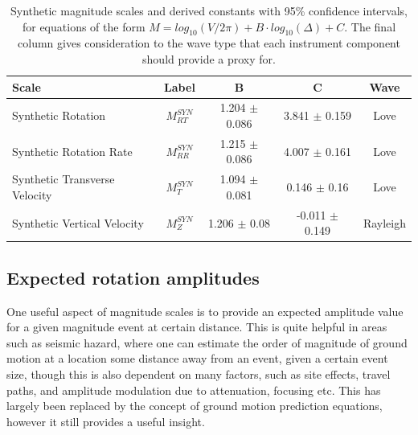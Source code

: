 \documentclass{gji}
\begin{document}
\begin{table}
\begin{minipage}{115mm}
	\begin{center}
		\begin{tabular}{ |l|c|c|c|c| } 
		        \bf{Scale} & \bf{Label} & \bf{B} & \bf{C}  & \bf{Wave}\\ \hline
        Synthetic Rotation  & $M^{SYN}_{RT}$ & 1.204 $\pm$ 0.086 & 3.841 $\pm$ 0.159  & Love \\ \hline
	Synthetic Rotation Rate & $M^{SYN}_{RR}$ & 1.215 $\pm$ 0.086 & 4.007 $\pm$ 0.161  & Love\\ \hline 
        Synthetic Transverse Velocity & $M^{SYN}_T$ & 1.094 $\pm$ 0.081 & 0.146 $\pm$ 0.16 & Love \\ \hline
        Synthetic Vertical Velocity  & $M^{SYN}_Z$ & 1.206 $\pm$ 0.08 & -0.011 $\pm$ 0.149  & Rayleigh \\ \hline
		\end{tabular}
		
    		\caption{Synthetic magnitude scales and derived constants with 95\% confidence intervals, for equations of the form $M = log_{10}(V/2\pi) + B\cdot log_{10}(\Delta) + C$. The final column gives consideration to the wave type that each instrument component should provide a proxy for.}
		\label{tab:syn_scales}
	\end{center}
	\end{minipage}
\end{table}


\subsection{Expected rotation amplitudes}
One useful aspect of magnitude scales is to provide an expected amplitude value for a given magnitude event at certain distance. This is quite helpful in areas such as seismic hazard, where one can estimate the order of magnitude of ground motion at a location some distance away from an event, given a certain event size, though this is also dependent on many factors, such as site effects, travel paths, and amplitude modulation due to attenuation, focusing etc. This has largely been replaced by the concept of ground motion prediction equations, however it still provides a useful insight.%
\end{document}

